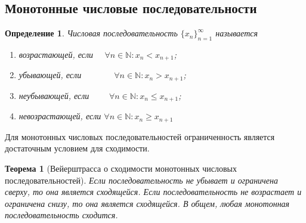 \documentclass[a4paper,12pt]{article} %
\newtheorem{definition}{Определение}[section]
\newtheorem{theorem}{Теорема}[section]
\theoremstyle{remark}
\theoremstyle{definition}
\begin{document}
\subsection{Монотонные числовые последовательности}
\begin{definition}
	Числовая последовательность $\{x_n\}_{n=1}^{\infty}$ называется 
	\begin{enumerate}
		\item возрастающей, если \ \ $\forall n\in \mathbb{N}:x_{n}<x_{n+1}$;
		\item убывающей, если \ \ \ \ \ \ \ $\forall n\in \mathbb{N}:x_{n}>x_{n+1}$;
		\item неубывающей, если \ \ \ \ $\forall n\in \mathbb{N}:x_{n}\le  x_{n+1}$;
		\item невозрастающей, если $\forall n\in \mathbb{N}:x_{n}\ge x_{n+1}$
	\end{enumerate}
\end{definition}
Для монотонных числовых последовательностей ограниченность является достаточным условием для сходимости.
\begin{theorem}[Вейерштрасса о сходимости монотонных числовых последовательностей]
	Если последовательность не убывает и ограничена сверху, то она является сходящейся.
	Если последовательность не возрастает и ограничена снизу, то она является сходящейся. В общем, любая монотонная последовательность сходится.
\end{theorem}
\end{document}
